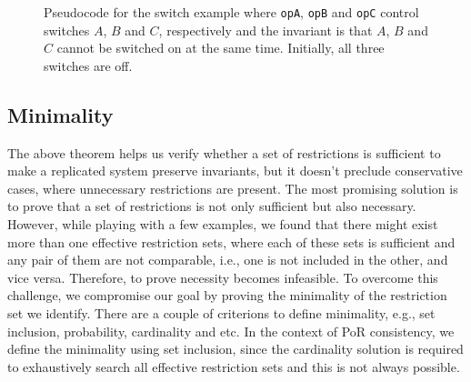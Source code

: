 \fi

\begin{figure}[t!]
\begin{minipage}[t]{0.3\textwidth}
\centering
{}
\end{minipage}
\hspace{2mm}
\begin{minipage}[t]{0.3\textwidth}
\end{minipage}
\hspace{2mm}
\begin{minipage}[t]{0.3\textwidth}
\centering
{}
\end{minipage}
\caption{Pseudocode for the switch example where \texttt{opA}, \texttt{opB} and \texttt{opC}
control switches $A$, $B$ and $C$, respectively and the invariant is that $A$,
$B$ and $C$ cannot be switched on at the same time. Initially, all three switches are off.}
\label{fig:por:threeops}
\end{figure}


\subsection{Minimality}
The above theorem helps us verify whether a set of restrictions is sufficient to
make a replicated system preserve invariants,
but it doesn't preclude conservative cases, where unnecessary restrictions are
present. The most promising solution is to prove that
a set of restrictions is not only sufficient but also necessary. However, while
playing with a few examples, we found that there might exist
more than one effective restriction sets, where each of these sets is sufficient and
any pair of them are not comparable, i.e., one is not included in the other, and
vice versa. Therefore, to prove necessity becomes infeasible. To overcome this challenge,
we compromise our goal by proving the minimality of the restriction set
we identify. There are a couple of criterions to define minimality, e.g.,
set inclusion, probability, cardinality and etc. In the context of
PoR consistency, we define the minimality using set inclusion,
since the cardinality solution is required to exhaustively search all effective restriction
sets and this is not always possible.

